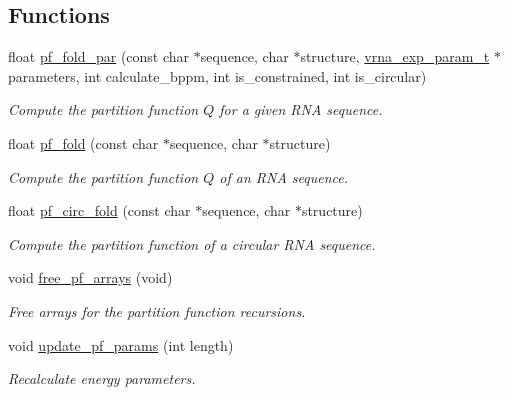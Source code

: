 \subsection*{Functions}
\begin{DoxyCompactItemize}
\item 
float \hyperlink{group__part__func__global__deprecated_gac4f95bee734b2563a3d6e9932117ebdf}{pf\+\_\+fold\+\_\+par} (const char $\ast$sequence, char $\ast$structure, \hyperlink{group__energy__parameters_ga01d8b92fe734df8d79a6169482c7d8d8}{vrna\+\_\+exp\+\_\+param\+\_\+t} $\ast$parameters, int calculate\+\_\+bppm, int is\+\_\+constrained, int is\+\_\+circular)
\begin{DoxyCompactList}\small\item\em Compute the partition function $Q$ for a given R\+NA sequence. \end{DoxyCompactList}\item 
float \hyperlink{group__part__func__global__deprecated_gadc3db3d98742427e7001a7fd36ef28c2}{pf\+\_\+fold} (const char $\ast$sequence, char $\ast$structure)
\begin{DoxyCompactList}\small\item\em Compute the partition function $Q$ of an R\+NA sequence. \end{DoxyCompactList}\item 
float \hyperlink{group__part__func__global__deprecated_ga819ce5fca8984004ac81c4a3b04cb735}{pf\+\_\+circ\+\_\+fold} (const char $\ast$sequence, char $\ast$structure)
\begin{DoxyCompactList}\small\item\em Compute the partition function of a circular R\+NA sequence. \end{DoxyCompactList}\item 
void \hyperlink{group__part__func__global__deprecated_gae73db3f49a94f0f72e067ecd12681dbd}{free\+\_\+pf\+\_\+arrays} (void)
\begin{DoxyCompactList}\small\item\em Free arrays for the partition function recursions. \end{DoxyCompactList}\item 
void \hyperlink{group__part__func__global__deprecated_ga384e927890f9c034ff09fa66da102d28}{update\+\_\+pf\+\_\+params} (int length)
\begin{DoxyCompactList}\small\item\em Recalculate energy parameters. \end{DoxyCompactList}\item 

\end{DoxyCompactItemize}
